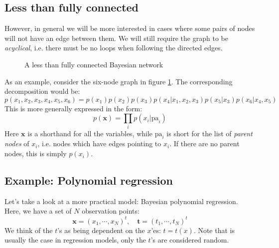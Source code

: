 \documentclass[12pt, a4paper]{article}
\numberwithin{equation}{section}
\begin{document}
\subsection{Less than fully connected}
However, in general we will be more interested in cases where some pairs of nodes will not have an edge between them. We will still require the graph to be \textit{acyclical}, i.e. there must be no loops when following the directed edges.

\begin{figure}
\centering
{}
\caption{A less than fully connected Bayesian network}
\label{graph:bn_notfull}
\end{figure}

As an example, consider the six-node graph in figure \ref{graph:bn_notfull}. The corresponding decomposition would be:
\begin{equation}
p(x_1, x_2, x_3, x_4, x_5, x_6)=p(x_1)p(x_2)p(x_3)p(x_4|x_1,x_2,x_3)p(x_5|x_3)p(x_6|x_4,x_5)
\end{equation}
This is more generally expressed in the form:
\begin{equation}
p(\mathbf{x})=\prod_i p(x_i|\textrm{pa}_i)
\label{parent_node_factorization}
\end{equation}
Here $\mathbf{x}$ is a shorthand for all the variables, while $\textrm{pa}_i$ is short for the list of \textit{parent nodes} of $x_i$, i.e. nodes which have edges pointing to $x_i$. If there are no parent nodes, this is simply $p(x_i)$.

\subsection{Example: Polynomial regression}
Let's take a look at a more practical model: Bayesian polynomial regression. Here, we have a set of $N$ observation points:
\begin{equation}
\mathbf{x}=(x_1,\cdots,x_N)^t,\quad \mathbf{t}=(t_1,\cdots,t_N)^t
\end{equation}
We think of the $t$'s as being dependent on the $x$'es: $t=t(x)$. Note that is usually the case in regression models, only the $t$'s are considered random.
\end{document}
